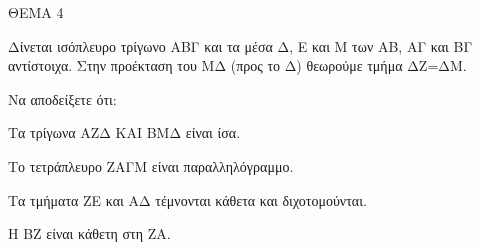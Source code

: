 
ΘΕΜΑ 4

Δίνεται ισόπλευρο τρίγωνο ΑΒΓ και τα μέσα Δ, Ε και Μ των ΑΒ, ΑΓ και ΒΓ αντίστοιχα. Στην προέκταση του ΜΔ (προς το Δ) θεωρούμε τμήμα ΔΖ=ΔΜ.

Να αποδείξετε ότι:

\begin{alist}
\item Τα τρίγωνα ΑΖΔ ΚΑΙ ΒΜΔ είναι ίσα. 

\item Το τετράπλευρο ΖΑΓΜ είναι παραλληλόγραμμο. 

\item Τα τμήματα ΖΕ και ΑΔ τέμνονται κάθετα και διχοτομούνται. 

\item Η ΒΖ είναι κάθετη στη ΖΑ. 


\end{alist}
